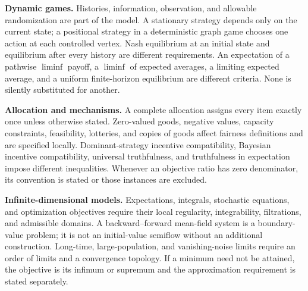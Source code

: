 \documentclass[11pt,a4paper]{article}
\begin{document}
\textbf{Dynamic games.} Histories, information, observation, and allowable
randomization are part of the model. A stationary strategy depends only on
the current state; a positional strategy in a deterministic graph game
chooses one action at each controlled vertex. Nash equilibrium at an initial
state and equilibrium after every history are different requirements.
An expectation of a pathwise $\liminf$ payoff, a $\liminf$ of expected averages,
a limiting expected average, and a uniform finite-horizon equilibrium are
 different criteria. None is silently substituted for another.

\textbf{Allocation and mechanisms.} A complete allocation assigns every item
exactly once unless otherwise stated. Zero-valued goods, negative values,
capacity constraints, feasibility, lotteries, and copies of goods affect
fairness definitions and are specified locally. Dominant-strategy incentive
compatibility, Bayesian incentive compatibility, universal truthfulness,
and truthfulness in expectation impose different inequalities. Whenever
an objective ratio has zero denominator, its convention is stated or those
instances are excluded.

\textbf{Infinite-dimensional models.} Expectations, integrals, stochastic
equations, and optimization objectives require their local regularity,
integrability, filtrations, and admissible domains. A backward--forward
mean-field system is a boundary-value problem; it is not an initial-value
semiflow without an additional construction. Long-time, large-population,
and vanishing-noise limits require an order of limits and a convergence
topology. If a minimum need not be attained, the objective is its infimum
or supremum and the approximation requirement is stated separately.
\end{document}
